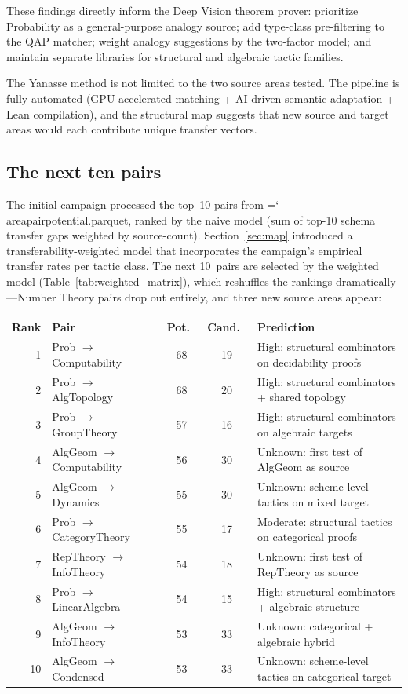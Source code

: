 \documentclass[11pt]{article}
\renewcommand{\texttt}[1]{%
  \begingroup\ttfamily\hyphenchar\font=`\-\relax
  \def\_{\textunderscore\discretionary{}{}{}}%
  #1\endgroup}
\theoremstyle{definition}
\theoremstyle{remark}
\begin{document}
These findings directly inform the Deep Vision theorem prover:
prioritize Probability as a general-purpose analogy source; add
type-class pre-filtering to the QAP matcher; weight analogy
suggestions by the two-factor model; and maintain separate libraries
for structural and algebraic tactic families.

The Yanasse method is not limited to the two source areas tested.
The pipeline is fully automated (GPU-accelerated matching +
AI-driven semantic adaptation + Lean compilation), and the
structural map suggests that new source and target areas would each
contribute unique transfer vectors.

\subsection*{The next ten pairs}

The initial campaign processed the top~10 pairs from
\texttt{area\_pair\_potential.parquet}, ranked by the naive model
(sum of top-10 schema transfer gaps weighted by source-count).
Section~\ref{sec:map} introduced a transferability-weighted model
that incorporates the campaign's empirical transfer rates per tactic
class.  The next 10~pairs are selected by the weighted model
(Table~\ref{tab:weighted_matrix}), which reshuffles the rankings
dramatically---Number Theory pairs drop out entirely, and three new
source areas appear:

\medskip
{\small
\begin{center}
\begin{tabular}{@{}rlccp{4.8cm}@{}}
\toprule
Rank & Pair & Pot.\ & Cand.\ & Prediction \\
\midrule
1 & Prob $\to$ Computability & 68 & 19
  & High: structural combinators on decidability proofs \\
2 & Prob $\to$ AlgTopology & 68 & 20
  & High: structural combinators + shared topology \\
3 & Prob $\to$ GroupTheory & 57 & 16
  & High: structural combinators on algebraic targets \\
4 & AlgGeom $\to$ Computability & 56 & 30
  & Unknown: first test of AlgGeom as source \\
5 & AlgGeom $\to$ Dynamics & 55 & 30
  & Unknown: scheme-level tactics on mixed target \\
6 & Prob $\to$ CategoryTheory & 55 & 17
  & Moderate: structural tactics on categorical proofs \\
7 & RepTheory $\to$ InfoTheory & 54 & 18
  & Unknown: first test of RepTheory as source \\
8 & Prob $\to$ LinearAlgebra & 54 & 15
  & High: structural combinators + algebraic structure \\
9 & AlgGeom $\to$ InfoTheory & 53 & 33
  & Unknown: categorical + algebraic hybrid \\
10 & AlgGeom $\to$ Condensed & 53 & 33
  & Unknown: scheme-level tactics on categorical target \\
\bottomrule
\end{tabular}
\end{center}
}
\end{document}

